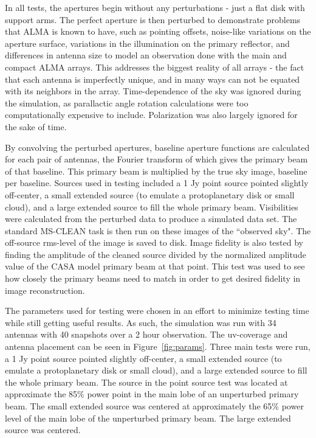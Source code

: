 \documentclass[11pt]{article}
\begin{document}
In all tests, the apertures begin without any perturbations - just a flat disk 
with support arms. The perfect aperture is then perturbed to demonstrate 
problems that ALMA is known to have, such as pointing offsets,
noise-like variations on the aperture surface, variations in the illumination 
on the primary reflector, and differences in antenna size to model an 
observation done with the main and compact ALMA arrays. This addresses the 
biggest reality of all arrays - the fact that each antenna is imperfectly 
unique, and in many ways can not be equated with its neighbors in the array.
Time-dependence of the sky was ignored during the simulation, as parallactic 
angle rotation calculations were too computationally expensive to include.  
Polarization was also largely ignored for the sake of time.

By convolving the perturbed apertures, baseline aperture functions are 
calculated for each pair of antennas, the Fourier transform of which gives the 
primary beam of that baseline. This primary beam is multiplied by the true sky 
image, baseline per baseline.  Sources used in testing included a 1 Jy point 
source pointed slightly off-center, a small extended source (to emulate a 
protoplanetary disk or small cloud), and a large extended source to fill the 
whole primary beam.  Visibilities were calculated from the perturbed data to 
produce a simulated data set. The standard MS-CLEAN task is then run on these 
images of the ``observed sky".  The off-source rms-level of the image is saved 
to disk. Image fidelity is also tested by finding the amplitude of the cleaned 
source divided by the normalized amplitude value of the CASA model primary beam 
at that point.  This test was used to see how closely the primary beams need to 
match in order to get desired fidelity in image reconstruction.

The parameters used for testing were chosen in an effort to minimize testing
time while still getting useful results. As such, the simulation was run
with 34 antennas with 40 snapshots over a 2 hour observation. The uv-coverage
and antenna placement can be seen in Figure~\ref{fig:params}. Three main tests
were run, a 1 Jy point source pointed slightly off-center, a small extended 
source (to emulate a protoplanetary disk or small cloud), and a large extended 
source to fill the whole primary beam. The source in the point source test was
located at approximate the 85$\%$ power point in the main lobe of an 
unperturbed primary beam. The small extended source was centered at 
approximately the 65$\%$ power level of the main lobe of the unperturbed 
primary beam. The large extended source was centered.
\end{document}
